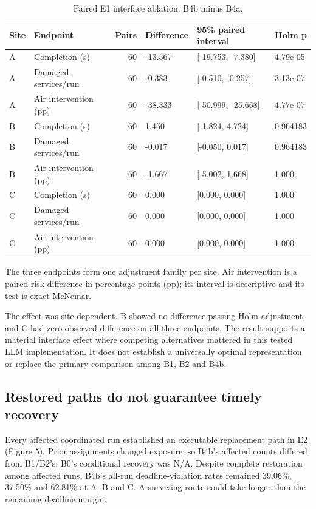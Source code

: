 \documentclass[]{interact}
\theoremstyle{plain}
\theoremstyle{definition}
\theoremstyle{remark}
\begin{document}
\begin{table}[!htbp]
\centering
\small
\setlength{\tabcolsep}{3pt}
\caption{Paired E1 interface ablation: B4b minus B4a.}
\label{tab:table5}
\begin{tabularx}{\textwidth}{@{}lYrYYY@{}}
\toprule
Site & Endpoint & Pairs & Difference & 95\% paired interval & Holm p \\
\midrule
A & Completion (s) & 60 & -13.567 & [-19.753, -7.380] & 4.79e-05 \\
A & Damaged services/run & 60 & -0.383 & [-0.510, -0.257] & 3.13e-07 \\
A & Air intervention (pp) & 60 & -38.333 & [-50.999, -25.668] & 4.77e-07 \\
B & Completion (s) & 60 & 1.450 & [-1.824, 4.724] & 0.964183 \\
B & Damaged services/run & 60 & -0.017 & [-0.050, 0.017] & 0.964183 \\
B & Air intervention (pp) & 60 & -1.667 & [-5.002, 1.668] & 1.000 \\
C & Completion (s) & 60 & 0.000 & [0.000, 0.000] & 1.000 \\
C & Damaged services/run & 60 & 0.000 & [0.000, 0.000] & 1.000 \\
C & Air intervention (pp) & 60 & 0.000 & [0.000, 0.000] & 1.000 \\
\bottomrule
\end{tabularx}
\end{table}

The three endpoints form one adjustment family per site. Air intervention is a paired risk difference in percentage points (pp); its interval is descriptive and its test is exact McNemar.

The effect was site-dependent. B showed no difference passing Holm adjustment, and C had zero observed difference on all three endpoints. The result supports a material interface effect where competing alternatives mattered in this tested LLM implementation. It does not establish a universally optimal representation or replace the primary comparison among B1, B2 and B4b.

\subsection{Restored paths do not guarantee timely recovery}

Every affected coordinated run established an executable replacement path in E2 (Figure 5). Prior assignments changed exposure, so B4b's affected counts differed from B1/B2's; B0's conditional recovery was N/A. Despite complete restoration among affected runs, B4b's all-run deadline-violation rates remained 39.06\%, 37.50\% and 62.81\% at A, B and C. A surviving route could take longer than the remaining deadline margin.
\end{document}
